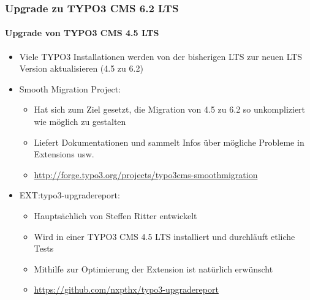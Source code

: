 
\begin{frame}[fragile]
	\frametitle{Upgrade zu TYPO3 CMS 6.2 LTS}
	\framesubtitle{Upgrade von TYPO3 CMS 4.5 LTS}

	\begin{itemize}
		\item Viele TYPO3 Installationen werden von der bisherigen LTS zur neuen LTS Version aktualisieren (4.5 zu 6.2)
		\item Smooth Migration Project:

			\begin{itemize}
				\item Hat sich zum Ziel gesetzt, die Migration von 4.5 zu 6.2 so unkompliziert wie möglich zu gestalten
				\item Liefert Dokumentationen und sammelt Infos über mögliche Probleme in Extensions usw.
				\item \smaller\url{http://forge.typo3.org/projects/typo3cms-smoothmigration}\normalsize
			\end{itemize}

		\item EXT:typo3-upgradereport:

			\begin{itemize}
				\item Hauptsächlich von Steffen Ritter entwickelt
				\item Wird in einer TYPO3 CMS 4.5 LTS installiert und durchläuft etliche Tests
				\item Mithilfe zur Optimierung der Extension ist natürlich erwünscht
				\item \smaller\url{https://github.com/nxpthx/typo3-upgradereport}\normalsize
			\end{itemize}
	\end{itemize}

\end{frame}


